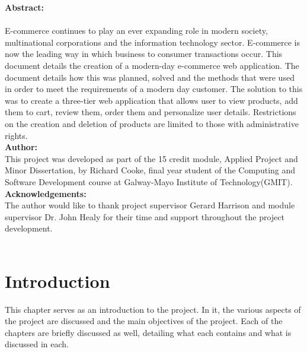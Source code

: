 
{\noindent\Large\textbf {Abstract:}} \\  \\ E-commerce continues to play an ever expanding role in modern society, multinational corporations and the information technology sector. E-commerce is now the leading way in which business to consumer transactions occur. This document details the creation of a modern-day e-commerce web application. The document details how this was planned, solved and the methods that were used in order to meet the requirements of a modern day customer. The solution to this was to create a three-tier web application that allows user to view products, add them to cart, review them, order them and personalize user details. Restrictions on the creation and deletion of products are limited to those with administrative rights. \\ 

{\noindent\Large\textbf {Author:}} \\  This project was developed as part of the 15 credit module, Applied Project and Minor Dissertation, by Richard Cooke, final year student of the Computing and Software Development course at Galway-Mayo Institute of Technology(GMIT).\\

{\noindent\Large\textbf {Acknowledgements:}} \\ The author would like to thank project supervisor Gerard Harrison and module supervisor Dr. John Healy for their time and support throughout the project development. \\ \\


\chapter{Introduction}
This chapter serves as an introduction to the project. In it, the various aspects
of the project are discussed and the main objectives of the project. Each of the 
chapters are briefly discussed as well, detailing what each contains and what is
discussed in each. \\ \\

